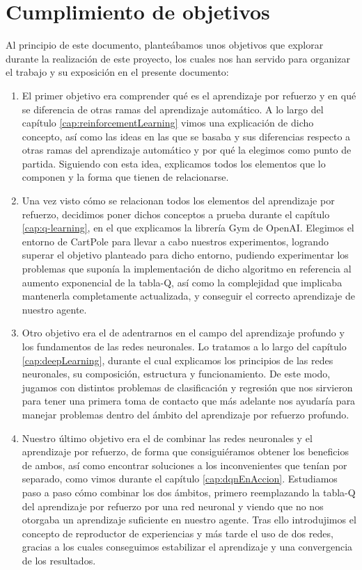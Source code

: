 \section{Cumplimiento de objetivos}

Al principio de este documento, planteábamos unos objetivos que explorar durante la realización de este proyecto, los cuales nos han servido para organizar el trabajo y su exposición en el presente documento:

\begin{enumerate}
        \item El primer objetivo era comprender qué es el aprendizaje por refuerzo y en qué se diferencia de otras ramas del aprendizaje automático. A lo largo del capítulo \ref{cap:reinforcementLearning} vimos una explicación de dicho concepto, así como las ideas en las que se basaba y sus diferencias respecto a otras ramas del aprendizaje automático y por qué la elegimos como punto de partida. Siguiendo con esta idea, explicamos todos los elementos que lo componen y la forma que tienen de relacionarse.
        \item Una vez visto cómo se relacionan todos los elementos del aprendizaje por refuerzo, decidimos poner dichos conceptos a prueba durante el capítulo \ref{cap:q-learning}, en el que explicamos la librería Gym de OpenAI. Elegimos el entorno de CartPole para llevar a cabo nuestros experimentos, logrando superar el objetivo planteado para dicho entorno, pudiendo experimentar los problemas que suponía la implementación de dicho algoritmo en referencia al aumento exponencial de la tabla-Q, así como la complejidad que implicaba mantenerla completamente actualizada, y conseguir el correcto aprendizaje de nuestro agente.
        \item Otro objetivo era el de adentrarnos en el campo del aprendizaje profundo y los fundamentos de las redes neuronales. Lo tratamos a lo largo del capítulo \ref{cap:deepLearning}, durante el cual explicamos los principios de las redes neuronales, su composición, estructura y funcionamiento. De este modo, jugamos con distintos problemas de clasificación y regresión que nos sirvieron para tener una primera toma de contacto que más adelante nos ayudaría para manejar problemas dentro del ámbito del aprendizaje por refuerzo profundo.
        \item Nuestro último objetivo era el de combinar las redes neuronales y el aprendizaje por refuerzo, de forma que consiguiéramos obtener los beneficios de ambos, así como encontrar soluciones a los inconvenientes que tenían por separado, como vimos durante el capítulo \ref{cap:dqnEnAccion}. Estudiamos paso a paso cómo combinar los dos ámbitos, primero reemplazando la tabla-Q del aprendizaje por refuerzo por una red neuronal y viendo que no nos otorgaba un aprendizaje suficiente en nuestro agente. Tras ello introdujimos el concepto de reproductor de experiencias y más tarde el uso de dos redes, gracias a los cuales conseguimos estabilizar el aprendizaje y una convergencia de los resultados.

\end{enumerate}
